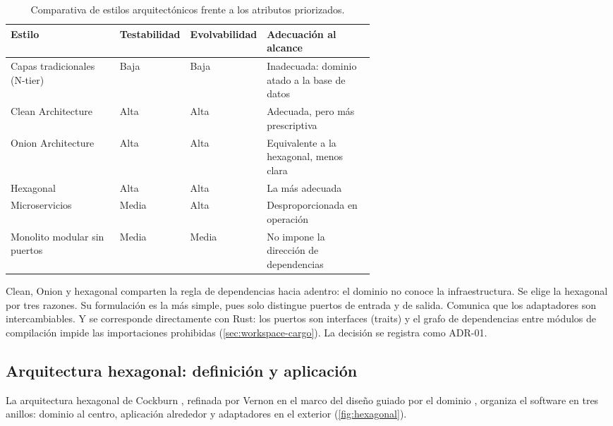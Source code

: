\begin{table}[H]
  \centering
  
  \caption{Comparativa de estilos arquitectónicos frente a los atributos priorizados.}
  \label{tab:comparativa-estilos}
  \begin{tabularx}{\linewidth}{@{}L{0.3\linewidth}C{0.145\linewidth}C{0.16\linewidth}>{\raggedright\arraybackslash}X@{}}
    \toprule
    \textbf{Estilo} & \textbf{Testabilidad} & \textbf{Evolvabilidad} & \textbf{Adecuación al alcance} \\
    \midrule
    Capas tradicionales (N-tier) & Baja & Baja & Inadecuada: dominio atado a la base de datos \\
    Clean Architecture \cite{martin2017} & Alta & Alta & Adecuada, pero más prescriptiva \\
    Onion Architecture & Alta & Alta & Equivalente a la hexagonal, menos clara \\
    Hexagonal \cite{cockburn2005} & Alta & Alta & La más adecuada \\
    Microservicios & Media & Alta & Desproporcionada en operación \\
    Monolito modular sin puertos & Media & Media & No impone la dirección de dependencias \\
    \bottomrule
  \end{tabularx}
\end{table}

Clean, Onion y hexagonal comparten la regla de dependencias hacia adentro: el dominio no conoce la infraestructura. Se elige la hexagonal por tres razones. Su formulación es la más simple, pues solo distingue puertos de entrada y de salida. Comunica que los adaptadores son intercambiables. Y se corresponde directamente con Rust: los puertos son interfaces (traits) y el grafo de dependencias entre módulos de compilación impide las importaciones prohibidas (\cref{sec:workspace-cargo}). La decisión se registra como ADR-01.

\subsection{Arquitectura hexagonal: definición y aplicación}\label{sec:hexagonal-definicion}

La arquitectura hexagonal de Cockburn \cite{cockburn2005}, refinada por Vernon \cite{vernon2013} en el marco del diseño guiado por el dominio \cite{evans2003}, organiza el software en tres anillos: dominio al centro, aplicación alrededor y adaptadores en el exterior (\cref{fig:hexagonal}).


